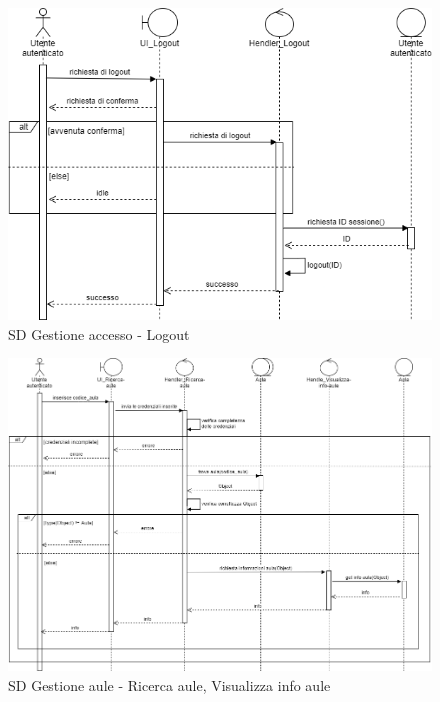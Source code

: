\documentclass[11pt]{article}
\begin{document}
\begin{figure}[H]
\centering
\includegraphics[width=1\textwidth]{SD Gestione accesso - Logout.png}
\caption{SD Gestione accesso - Logout}
\end{figure}

\begin{figure}[H]
\centering
\includegraphics[width=1\textwidth]{SD Gestione aule - Ricerca aule, Visualizza info aule.png}
\caption{SD Gestione aule - Ricerca aule, Visualizza info aule}
\end{figure}
\end{document}
